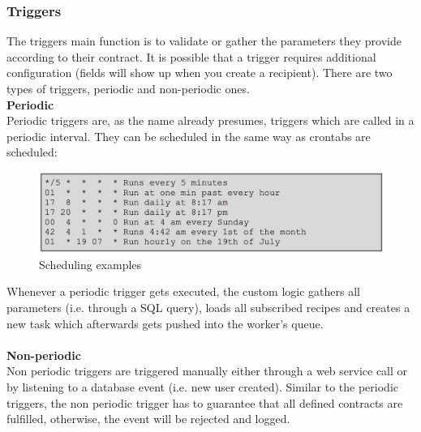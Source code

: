 \documentclass[11pt]{article} %
\begin{document}
\subsubsection{Triggers}
The triggers main function is to validate or gather the parameters they provide according to their contract. It is possible that a trigger requires additional configuration (fields will show up when you create a recipient). There are two types of triggers, periodic and non-periodic ones.\\

\textbf{Periodic}\\
Periodic triggers are, as the name already presumes, triggers which are called in a periodic interval. They can be scheduled in the same way as crontabs are scheduled:

\begin{figure}[H]
\begin{center}
\includegraphics[width=1.0\textwidth]{cron}
\end{center}
\caption{Scheduling examples}
\label{fig:cron}
\end{figure}

Whenever a periodic trigger gets executed, the custom logic gathers all parameters (i.e. through a SQL query), loads all subscribed recipes and creates a new task which afterwards gets pushed into the worker’s queue.\\
\\
\textbf{Non-periodic}\\

Non periodic triggers are triggered manually either through a web service call or by listening to a database event (i.e. new user created). Similar to the periodic triggers, the non periodic trigger has to guarantee that all defined contracts are fulfilled, otherwise, the event will be rejected and logged.
\end{document}
